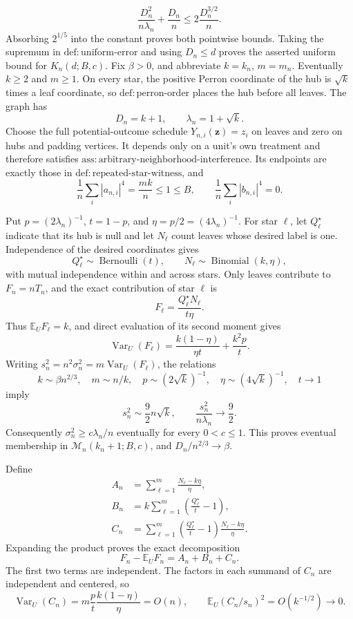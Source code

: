 \[
 \frac{D_n^2}{n\lambda_n}+\frac{D_n}{n}
 \le 2\frac{D_n^{3/2}}n.
\]
Absorbing \(2^{1/5}\) into the constant proves both pointwise bounds.  Taking the supremum in \(\mathrm{def:uniform\text{-}error}\) and using \(D_n\le d\) proves the asserted uniform bound for \(K_n(d;B,c)\).
Fix \(\beta>0\), and abbreviate \(k=k_n\), \(m=m_n\).  Eventually \(k\ge2\) and \(m\ge1\).  On every star, the positive Perron coordinate of the hub is \(\sqrt{k}\) times a leaf coordinate, so \(\mathrm{def:perron\text{-}order}\) places the hub before all leaves.  The graph has
\[
 D_n=k+1,\qquad \lambda_n=1+\sqrt{k}.
\]
Choose the full potential-outcome schedule \(Y_{n,i}(\mathbf z)=z_i\) on leaves and zero on hubs and padding vertices.  It depends only on a unit's own treatment and therefore satisfies \(\mathrm{ass:arbitrary\text{-}neighborhood\text{-}interference}\).  Its endpoints are exactly those in \(\mathrm{def:repeated\text{-}star\text{-}witness}\), and
\[
 \frac1n\sum_i|a_{n,i}|^4=\frac{mk}{n}\le1\le B,\qquad
 \frac1n\sum_i|b_{n,i}|^4=0.
\]

Put \(p=(2\lambda_n)^{-1}\), \(t=1-p\), and \(\eta=p/2=(4\lambda_n)^{-1}\).  For star \(\ell\), let \(Q_\ell^\star\) indicate that its hub is null and let \(N_\ell\) count leaves whose desired label is one.  Independence of the desired coordinates gives
\[
 Q_\ell^\star\sim\operatorname{Bernoulli}(t),\qquad
 N_\ell\sim\operatorname{Binomial}(k,\eta),
\]
with mutual independence within and across stars.  Only leaves contribute to \(F_n=nT_n\), and the exact contribution of star \(\ell\) is
\[
 F_\ell=\frac{Q_\ell^\star N_\ell}{t\eta}.
\]
Thus \(\mathbb E_UF_\ell=k\), and direct evaluation of its second moment gives
\[
 \operatorname{Var}_U(F_\ell)
 =\frac{k(1-\eta)}{\eta t}+\frac{k^2p}{t}.
\]
Writing \(s_n^2=n^2\sigma_n^2=m\operatorname{Var}_U(F_\ell)\), the relations
\[
 k\sim\beta n^{2/3},\quad m\sim n/k,\quad
 p\sim(2\sqrt{k})^{-1},\quad\eta\sim(4\sqrt{k})^{-1},\quad t\to1
\]
imply
\[
 s_n^2\sim\frac92n\sqrt{k},\qquad
 \frac{s_n^2}{n\lambda_n}\longrightarrow\frac92.
\]
Consequently \(\sigma_n^2\ge c\lambda_n/n\) eventually for every \(0<c\le1\).  This proves eventual membership in \(\mathcal M_n(k_n+1;B,c)\), and \(D_n/n^{2/3}\to\beta\).

Define
\[
 \begin{aligned}
 A_n&=\sum_{\ell=1}^m\frac{N_\ell-k\eta}{\eta},\\
 B_n&=k\sum_{\ell=1}^m\left(\frac{Q_\ell^\star}{t}-1\right),\\
 C_n&=\sum_{\ell=1}^m\left(\frac{Q_\ell^\star}{t}-1\right)
              \frac{N_\ell-k\eta}{\eta}.
 \end{aligned}
\]
Expanding the product proves the exact decomposition
\[
 F_n-\mathbb E_UF_n=A_n+B_n+C_n.
\]
The first two terms are independent.  The factors in each summand of \(C_n\) are independent and centered, so
\[
 \operatorname{Var}_U(C_n)
 =m\frac pt\frac{k(1-\eta)}\eta=O(n),\qquad
 \mathbb E_U(C_n/s_n)^2=O(k^{-1/2})\longrightarrow0.
\]

